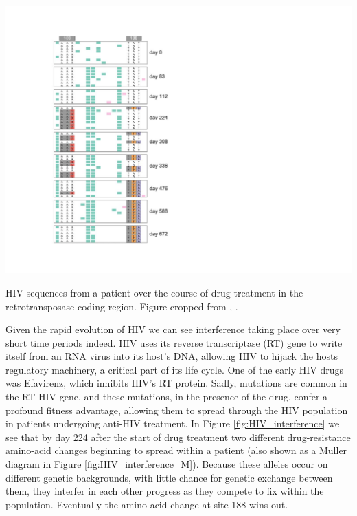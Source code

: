 \begin{marginfigure}
\begin{center}
  \includegraphics[width =  \textwidth]{Journal_figs/recom_selection/Pleuni_HIV_interference/Trimmed_HIV_interference}  %
\end{center}
\caption{HIV sequences from a patient over the course of drug treatment in the retrotransposase coding region. Figure cropped from \citet{Williams548198}, \PLOSccBY.} \label{fig:HIV_interference}  %
\end{marginfigure}
Given the rapid evolution of HIV we can see interference taking place over very short time periods indeed. HIV uses its reverse transcriptase (RT) gene to write itself from an RNA virus into its host's DNA, allowing HIV to hijack the hosts regulatory machinery, a critical part of its life cycle. One of the early HIV drugs was Efavirenz, which inhibits HIV's RT protein. Sadly, mutations are common in the RT HIV gene, and these mutations, in the presence of the drug, confer a profound fitness advantage, allowing them to spread through the HIV population in patients undergoing anti-HIV treatment. In Figure \ref{fig:HIV_interference} we see that by day 224 after the start of drug treatment two different drug-resistance amino-acid changes beginning to spread within a patient (also shown as a Muller diagram in Figure \ref{fig:HIV_interference_M}). Because these alleles occur on different genetic backgrounds, with little chance for genetic exchange between them, they interfer in each other progress as they compete to fix within the population. Eventually the amino acid change at site 188 wins out. 

